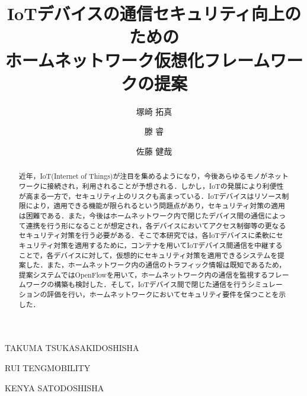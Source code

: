 \documentclass[Japanese]{dicomopapers}
\begin{document}
\title{IoTデバイスの通信セキュリティ向上のための\\ホームネットワーク仮想化フレームワークの提案}


\author{塚崎 拓真}{TAKUMA TSUKASAKI}{DOSHISHA}
\author{滕 睿}{RUI TENG}{MOBILITY}
\author{佐藤 健哉}{KENYA SATO}{DOSHISHA}

\begin{abstract}
	近年，IoT(Internet of Things)が注目を集めるようになり，今後あらゆるモノがネットワークに接続され，利用されることが予想される．しかし，IoTの発展により利便性が高まる一方で，セキュリティ上のリスクも高まっている．IoTデバイスはリソース制限により，適用できる機能が限られるという問題点があり，セキュリティ対策の適用は困難である．また，今後はホームネットワーク内で閉じたデバイス間の通信によって連携を行う形になることが想定され，各デバイスにおいてアクセス制御等の更なるセキュリティ対策を行う必要がある．そこで本研究では，各IoTデバイスに柔軟にセキュリティ対策を適用するために，コンテナを用いてIoTデバイス間通信を中継することで，各デバイスに対して，仮想的にセキュリティ対策を適用できるシステムを提案した．また，ホームネットワーク内の通信のトラフィック情報は既知であるため，提案システムではOpenFlowを用いて，ホームネットワーク内の通信を監視するフレームワークの構築も検討した．そして，IoTデバイス間で閉じた通信を行うシミュレーションの評価を行い，ホームネットワークにおいてセキュリティ要件を保つことを示した．
\end{abstract}

\maketitle

\end{document}
